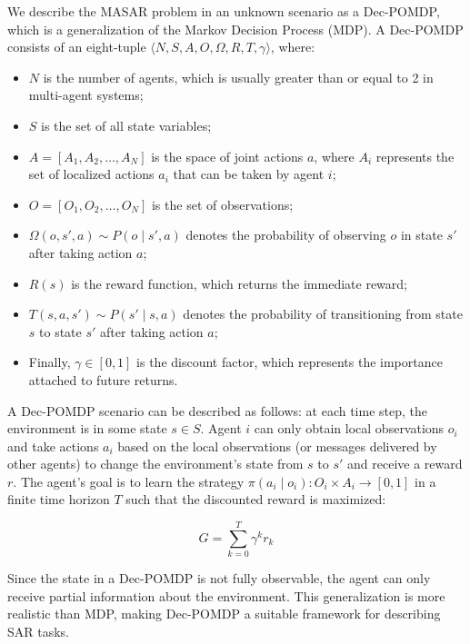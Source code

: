 \documentclass[lettersize,journal]{IEEEtran}
\begin{document}
We describe the MASAR problem in an unknown scenario as a Dec-POMDP, which is a generalization of the Markov Decision Process (MDP). A Dec-POMDP consists of an eight-tuple \( \langle N, S, A, O, \Omega, R, T, \gamma \rangle \), where:
\begin{itemize}
    \item \( N \) is the number of agents, which is usually greater than or equal to 2 in multi-agent systems;
    \item \( S \) is the set of all state variables;
    \item \( A = [A_1, A_2, \dots, A_N] \) is the space of joint actions \( a \), where \( A_i \) represents the set of localized actions \( a_i \) that can be taken by agent \( i \);
    \item \( O = [O_1, O_2, \dots, O_N] \) is the set of observations;
    \item \( \Omega(o, s', a) \sim P(o \mid s', a) \) denotes the probability of observing \( o \) in state \( s' \) after taking action \( a \);
    \item \( R(s) \) is the reward function, which returns the immediate reward;
    \item \( T(s, a, s') \sim P(s' \mid s, a) \) denotes the probability of transitioning from state \( s \) to state \( s' \) after taking action \( a \);
    \item Finally, \( \gamma \in [0, 1] \) is the discount factor, which represents the importance attached to future returns.
\end{itemize}

A Dec-POMDP scenario can be described as follows: at each time step, the environment is in some state \( s \in S \). Agent \( i \) can only obtain local observations \( o_i \) and take actions \( a_i \) based on the local observations (or messages delivered by other agents) to change the environment's state from \( s \) to \( s' \) and receive a reward \( r \). The agent's goal is to learn the strategy \( \pi(a_i \mid o_i): O_i \times A_i \to [0, 1] \) in a finite time horizon \( T \) such that the discounted reward is maximized:

\begin{equation}
G = \sum_{k=0}^{T} \gamma^k r_k
\end{equation}

Since the state in a Dec-POMDP is not fully observable, the agent can only receive partial information about the environment. This generalization is more realistic than MDP, making Dec-POMDP a suitable framework for describing SAR tasks.
\end{document}
